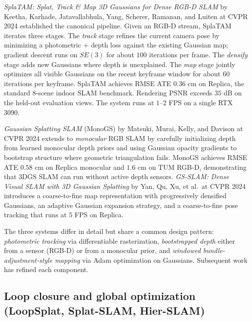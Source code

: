 \documentclass{article}
\begin{document}
\emph{SplaTAM: Splat, Track \& Map 3D Gaussians for Dense RGB-D SLAM} by Keetha, Karhade, Jatavallabhula, Yang, Scherer, Ramanan, and Luiten at CVPR 2024 \cite{keetha2024splatamsplattracka} established the canonical pipeline. Given an RGB-D stream, SplaTAM iterates three stages. The \emph{track} stage refines the current camera pose by minimizing a photometric + depth loss against the existing Gaussian map; gradient descent runs on \(SE(3)\) for about \(100\) iterations per frame. The \emph{densify} stage adds new Gaussians where depth is unexplained. The \emph{map} stage jointly optimizes all visible Gaussians on the recent keyframe window for about \(60\) iterations per keyframe. SplaTAM achieves RMSE ATE \(0.36\) cm on Replica, the standard \(8\)-scene indoor SLAM benchmark. Rendering PSNR exceeds \(35\) dB on the held-out evaluation views. The system runs at \(1\)--\(2\) FPS on a single RTX 3090.

\emph{Gaussian Splatting SLAM} (MonoGS) by Matsuki, Murai, Kelly, and Davison at CVPR 2024 \cite{matsuki2024gaussiansplattings} extends to \emph{monocular} RGB SLAM by carefully initializing depth from learned monocular depth priors and using Gaussian opacity gradients to bootstrap structure where geometric triangulation fails. MonoGS achieves RMSE ATE \(0.58\) cm on Replica monocular and \(1.6\) cm on TUM RGB-D, demonstrating that 3DGS SLAM can run without active depth sensors. \emph{GS-SLAM: Dense Visual SLAM with 3D Gaussian Splatting} by Yan, Qu, Xu, et al.~at CVPR 2024 \cite{yan2024multiscale3dgaussi} introduces a coarse-to-fine map representation with progressively densified Gaussians, an adaptive Gaussian expansion strategy, and a coarse-to-fine pose tracking that runs at \(5\) FPS on Replica.

The three systems differ in detail but share a common design pattern: \emph{photometric tracking} via differentiable rasterization, \emph{bootstrapped depth} either from a sensor (RGB-D) or from a monocular prior, and \emph{windowed bundle-adjustment-style mapping} via Adam optimization on Gaussians. Subsequent work has refined each component.

\subsection{Loop closure and global optimization (LoopSplat, Splat-SLAM, Hier-SLAM)}\label{loop-closure-and-global-optimization-loopsplat-splat-slam-hier-slam}
\end{document}
